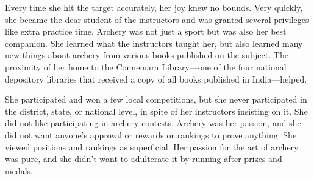 Every time she hit the target accurately, her joy knew no bounds. Very quickly, she
became the dear student of the instructors and was granted several privileges
like extra practice time. Archery was not just a sport but was also her best
companion. She learned what the instructors taught her, but also learned many
new things about archery from various books published on the subject. The
proximity of her home to the Connemara Library—one of the four national
depository libraries that received a copy of all books published in India—helped.

She participated and won a few local competitions, but she never participated in the
district, state, or national level, in spite of her
instructors insisting on it. She did not like participating in archery contests.
Archery was her passion, and she did not want anyone's approval or rewards or
rankings to prove anything. She viewed positions and rankings as superficial. Her
passion for the art of archery was pure, and she didn't want to
adulterate it by running after prizes and medals.
